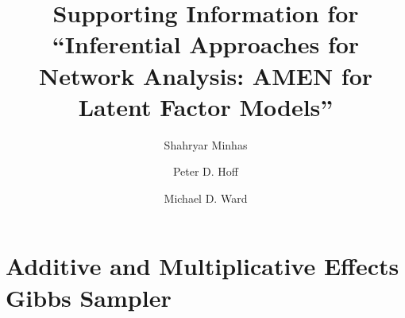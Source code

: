 \documentclass[12pt,pdflatex]{elsarticle}
\begin{document}
\thispagestyle{empty}
\begin{frontmatter}

\title{Supporting Information for ``Inferential Approaches for Network Analysis: AMEN for Latent Factor Models''}


\author[msu]{Shahryar Minhas}
\author[duke2]{Peter D. Hoff}
\author[duke]{Michael D. Ward}

\address[msu]{Department of Political Science, Michigan State University, East Lansing, MI 48824, USA}
\address[duke]{Department of Political Science, Duke University, Durham, NC 27701, USA}
\address[duke2]{Department of Statistical Science, Duke University, Durham, NC 27701, USA}


\end{frontmatter}

\newpage\setcounter{page}{1}

\section*{Additive and Multiplicative Effects Gibbs Sampler}
\end{document}
